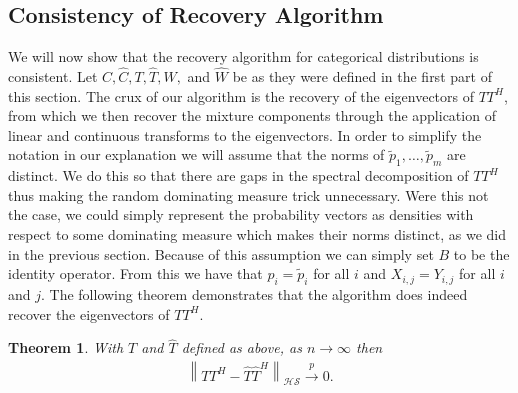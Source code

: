 \documentclass[aos,preprint]{imsart}
\def\l{\left}
\def\r{\right}
\def\hs{\mathscr{HS}}
\def\cip{\overset{p}{\rightarrow}}
\theoremstyle{plain}
\newtheorem{thm}{Theorem}[section]
\theoremstyle{defintion}
\begin{document}
	\subsection{Consistency of Recovery Algorithm}
	We will now show that the recovery algorithm for categorical distributions is consistent. Let $C,\widehat{C},T, \widehat{T},W,$ and $\widehat{W}$ be as they were defined in the first part of this section. The crux of our algorithm is the recovery of the eigenvectors of $TT^H$, from which we then recover the mixture components through the application of linear and continuous transforms to the eigenvectors. In order to simplify the notation in our explanation we will assume that the norms of $\tilde{p}_1,\ldots, \tilde{p}_m$ are distinct. We do this so that there are gaps in the spectral decomposition of $TT^H$ thus making the random dominating measure trick unnecessary. Were this not the case, we could simply represent the probability vectors as densities with respect to some dominating measure which makes their norms distinct, as we did in the previous section. Because of this assumption we can simply set $B$ to be the identity operator. From this we have that $p_i = \tilde{p}_i$ for all $i$ and $X_{i,j} = Y_{i,j}$ for all $i$ and $j$. The following theorem demonstrates that the algorithm does indeed recover the eigenvectors of $TT^H$.
	\begin{thm}\label{thm:consistency}
		With $T$ and $\widehat{T}$ defined as above, as $n\to \infty$ then
		\begin{align*}
			\l\|TT^H - \widehat{T}\widehat{T}^H\r\|_\hs \cip 0.
		\end{align*}
	\end{thm}
\end{document}
